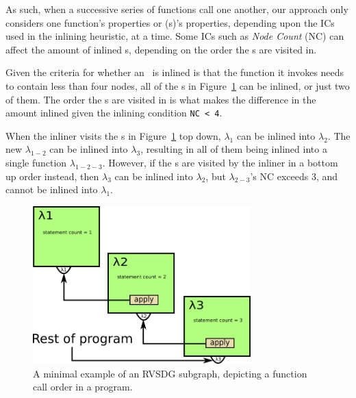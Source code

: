 
As such, when a successive series of functions call one another, our approach
only considers one function's properties or \applyNode (s)'s properties,
depending upon the ICs used in the inlining heuristic, at a time. Some ICs such
as \textit{Node Count} (NC) can affect the amount of inlined \applyNode s,
depending on the order the \applyNode s are visited in.

Given the criteria for whether an \applyNode~is inlined is that the function it
invokes needs to contain less than four nodes, all of the \applyNode s in
Figure~\ref{fig:inline_ordering_ex} can be inlined, or just two of them. The
order the \applyNode s are visited in is what makes the difference in the amount
inlined given the inlining condition \lstinline!NC < 4!.

When the inliner visits the \applyNode s in Figure~\ref{fig:inline_ordering_ex}
top down, $\lambda_1$ can be inlined into $\lambda_2$. The new $\lambda_{1-2}$
can be inlined into $\lambda_3$, resulting in all of them being inlined into a
single function $\lambda_{1-2-3}$. However, if the \applyNode s are visited by
the inliner in a bottom up order instead, then $\lambda_3$ can be inlined into
$\lambda_2$, but $\lambda_{2-3}$'s NC exceeds 3, and cannot be inlined into
$\lambda_1$.

\begin{figure}[H]
	\centering
	\includegraphics[width=0.75\textwidth]{figures/inline_ordering_ex}
	\caption{A minimal example of an RVSDG subgraph, depicting a function call
order in a program.}
	\label{fig:inline_ordering_ex}
\end{figure}

